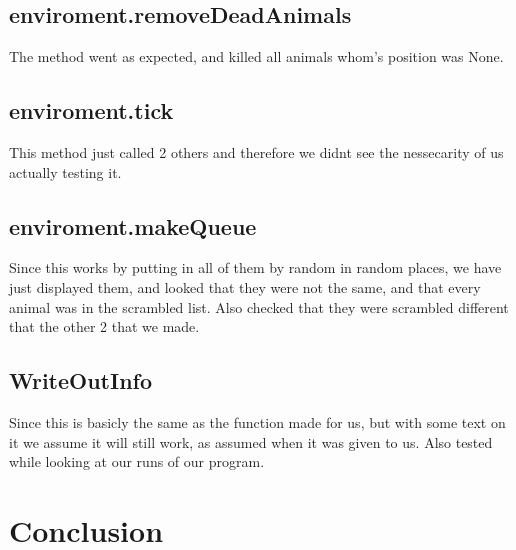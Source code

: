 \documentclass{article}
\begin{document}
    \subsection{enviroment.removeDeadAnimals}
    The method went as expected, and killed all animals whom's position was None.
    
    \subsection{enviroment.tick}
    This method just called 2 others and therefore we didnt see the nessecarity of us actually testing it.
    
    \subsection{enviroment.makeQueue}
    Since this works by putting in all of them by random in random places, we have just displayed them, and looked that they were not the same, and that every animal was in the scrambled list. Also checked that they were scrambled different that the other 2 that we made.
    
    \subsection{WriteOutInfo}
    Since this is basicly the same as the function made for us, but with some text on it we assume it will still work, as assumed when it was given to us. Also tested while looking at our runs of our program.
    
    \section{Conclusion}
     
\end{document}
